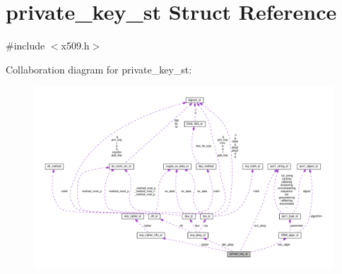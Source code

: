 \hypertarget{structprivate__key__st}{}\section{private\+\_\+key\+\_\+st Struct Reference}
\label{structprivate__key__st}


{\ttfamily \#include $<$x509.\+h$>$}



Collaboration diagram for private\+\_\+key\+\_\+st\+:
\nopagebreak
\begin{figure}[H]
\begin{center}
\leavevmode
\includegraphics[width=350pt]{structprivate__key__st__coll__graph}
\end{center}
\end{figure}

